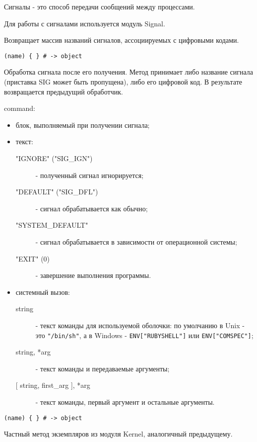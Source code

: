 Сигналы - это способ передачи сообщений между процессами.

Для работы с сигналами используется модуль Signal.

\begin{methodlist}
  Возвращает массив названий сигналов, ассоциируемых с цифровыми кодами.

  \verb!(name) { } # -> object!

  Обработка сигнала после его получения. Метод принимает либо название сигнала (приставка SIG может быть пропущена), либо его цифровой код. В результате возвращается предыдущий обработчик.

  command:
  \begin{itemize}
    \item блок, выполняемый при получении сигнала;
    
    \item текст:
    \begin{description}
      \item["IGNORE" ("SIG_IGN")] - полученный сигнал игнорируется;
      \item["DEFAULT" ("SIG_DFL")] - сигнал обрабатывается как обычно;
      \item["SYSTEM_DEFAULT"] - сигнал обрабатывается в зависимости от операционной системы;
      \item["EXIT" (0)] - завершение выполнения программы. 
    \end{description}

    \item системный вызов:
    \begin{description}
      \item[string] - текст команды для используемой оболочки: по умолчанию в Unix - это \verb!"/bin/sh"!, а в Windows - \verb!ENV["RUBYSHELL"]! или \verb!ENV["COMSPEC"]!;
      \item[string, *arg] - текст команды и передаваемые аргументы;
      \item[{[ string, first_arg ], *arg}] - текст команды, первый аргумент и остальные аргументы. 
  \end{description}
  \end{itemize}

  \verb!(name) { } # -> object!

  Частный метод экземпляров из модуля Kernel, аналогичный предыдущему.
\end{methodlist}